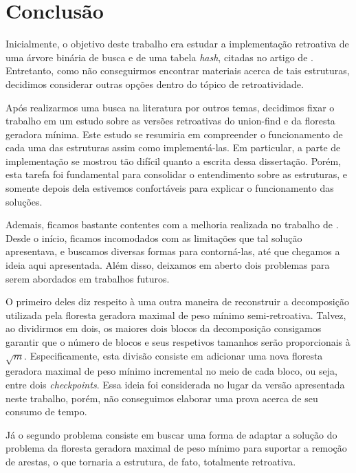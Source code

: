 
\chapter{Conclusão}
\label{cap:conclusao}

Inicialmente, o objetivo deste trabalho era estudar a implementação retroativa de uma árvore binária de busca e de uma tabela \emph{hash}, citadas no artigo de \citet{agarwalimplementation}. Entretanto, como não conseguirmos encontrar materiais acerca de tais estruturas, decidimos considerar outras opções dentro do tópico de retroatividade.

Após realizarmos uma busca na literatura por outros temas, decidimos fixar o trabalho em um estudo sobre as versões retroativas do union-find e da floresta geradora mínima. Este estudo se resumiria em compreender o funcionamento de cada uma das estruturas assim como implementá-las. Em particular, a parte de implementação se mostrou tão difícil quanto a escrita dessa dissertação. Porém, esta tarefa foi fundamental para consolidar o entendimento sobre as estruturas, e somente depois dela estivemos confortáveis para explicar o funcionamento das soluções.

Ademais, ficamos bastante contentes com a melhoria realizada no trabalho de \citet{10.1093/comjnl/bxaa135}. Desde o início, ficamos incomodados com as limitações que tal solução apresentava, e buscamos diversas formas para contorná-las, até que chegamos a ideia aqui apresentada. Além disso, deixamos em aberto dois problemas para serem abordados em trabalhos futuros.

O primeiro deles diz respeito à uma outra maneira de reconstruir a decomposição utilizada pela floresta geradora maximal de peso mínimo semi-retroativa. Talvez, ao dividirmos em dois, os maiores dois blocos da decomposição consigamos garantir que o número de blocos e seus respetivos tamanhos serão proporcionais à $\sqrt{m}$. Especificamente, esta divisão consiste em adicionar uma nova floresta geradora maximal de peso mínimo incremental no meio de cada bloco, ou seja, entre dois \emph{checkpoints}. Essa ideia foi considerada no lugar da versão apresentada neste trabalho, porém, não conseguimos elaborar uma prova acerca de seu consumo de tempo.

Já o segundo problema consiste em buscar uma forma de adaptar a solução do problema da floresta geradora maximal de peso mínimo para suportar a remoção de arestas, o que tornaria a estrutura, de fato, totalmente retroativa.

